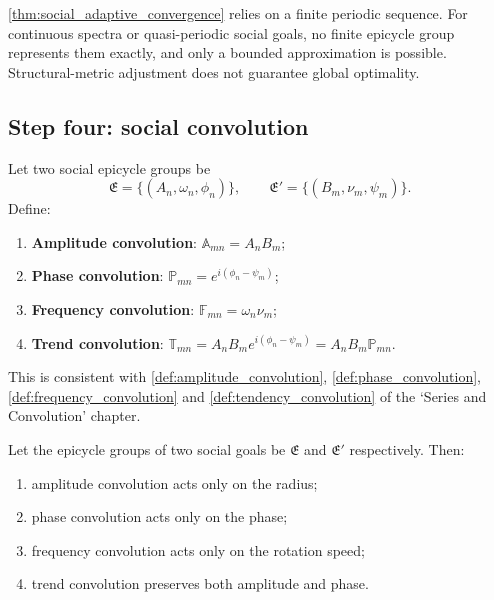 \begin{remark}\label{rem:social_adaptive_boundary}
\cref{thm:social_adaptive_convergence} relies on a finite periodic sequence. For continuous spectra or quasi-periodic social goals, no finite epicycle group represents them exactly, and only a bounded approximation is possible. Structural-metric adjustment does not guarantee global optimality.
\end{remark}

\subsection{Step four: social convolution}

\begin{definition}\label{def:social_convolution_types}
Let two social epicycle groups be
\[
\mathfrak E=\{(A_n,\omega_n,\phi_n)\},\qquad
\mathfrak E'=\{(B_m,\nu_m,\psi_m)\}.
\]
Define:
\begin{enumerate}[label=(\roman*)]
    \item \textbf{Amplitude convolution}: $\mathbb A_{mn}=A_nB_m$;
    \item \textbf{Phase convolution}: $\mathbb P_{mn}=e^{i(\phi_n-\psi_m)}$;
    \item \textbf{Frequency convolution}: $\mathbb F_{mn}=\omega_n\nu_m$;
    \item \textbf{Trend convolution}: $\mathbb T_{mn}=A_nB_m e^{i(\phi_n-\psi_m)}=A_nB_m\mathbb P_{mn}$.
\end{enumerate}
This is consistent with \cref{def:amplitude_convolution}, \cref{def:phase_convolution}, \cref{def:frequency_convolution} and \cref{def:tendency_convolution} of the `Series and Convolution' chapter.
\end{definition}

\begin{theorem}\label{thm:social_convolution_action}
Let the epicycle groups of two social goals be $\mathfrak E$ and $\mathfrak E'$ respectively. Then:
\begin{enumerate}[label=(\roman*)]
    \item amplitude convolution acts only on the radius;
    \item phase convolution acts only on the phase;
    \item frequency convolution acts only on the rotation speed;
    \item trend convolution preserves both amplitude and phase.
\end{enumerate}
\end{theorem}

